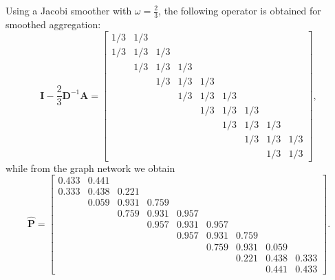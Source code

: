 \documentclass{article}
\newcommand{\mat}[1]{\bm{{#1}}}
\newcommand{\sfrac}[2]{#1/#2}
\begin{document}
Using a Jacobi smoother with $\omega=\frac{2}{3}$, the following operator is obtained for smoothed aggregation:
\begin{equation}
  \mat{I} - \frac{2}{3}\mat{D}^{-1}\mat{A} =
  \begin{bmatrix}
\sfrac{1}{3} & \sfrac{1}{3} &  &  &  &  &  &  &  \\
\sfrac{1}{3} & \sfrac{1}{3} & \sfrac{1}{3} &  &  &  &  &  &  \\
 & \sfrac{1}{3} & \sfrac{1}{3} & \sfrac{1}{3} &  &  &  &  &  \\
 &  & \sfrac{1}{3} & \sfrac{1}{3} & \sfrac{1}{3} &  &  &  &  \\
 &  &  & \sfrac{1}{3} & \sfrac{1}{3} & \sfrac{1}{3} &  &  &  \\
 &  &  &  & \sfrac{1}{3} & \sfrac{1}{3} & \sfrac{1}{3} &  &  \\
 &  &  &  &  & \sfrac{1}{3} & \sfrac{1}{3} & \sfrac{1}{3} &  \\
 &  &  &  &  &  & \sfrac{1}{3} & \sfrac{1}{3} & \sfrac{1}{3} \\
 &  &  &  &  &  &  & \sfrac{1}{3} & \sfrac{1}{3}
\end{bmatrix},
\end{equation}
while from the graph network we obtain
\begin{equation}
  \mat{\hat{P}} =
  \begin{bmatrix}
0.433 & 0.441 &  &  &  &  &  &  &  \\
0.333 & 0.438 & 0.221 &  &  &  &  &  &  \\
 & 0.059 & 0.931 & 0.759 &  &  &  &  &  \\
 &  & 0.759 & 0.931 & 0.957 &  &  &  &  \\
 &  &  & 0.957 & 0.931 & 0.957 &  &  &  \\
 &  &  &  & 0.957 & 0.931 & 0.759 &  &  \\
 &  &  &  &  & 0.759 & 0.931 & 0.059 &  \\
 &  &  &  &  &  & 0.221 & 0.438 & 0.333 \\
 &  &  &  &  &  &  & 0.441 & 0.433
\end{bmatrix}.
\end{equation}
\end{document}
